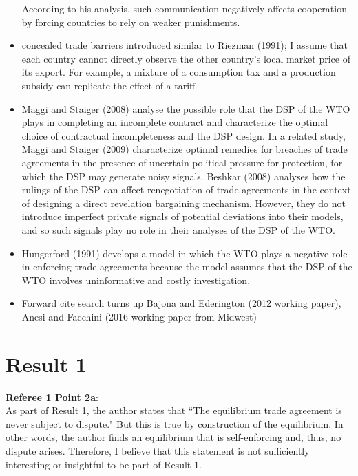 \documentclass[12pt]{article}
\begin{document}
\begin{itemize}
According to his analysis, such communication negatively affects cooperation by forcing countries to rely on weaker
punishments.
	\item concealed trade barriers introduced similar to Riezman (1991); I assume that each country cannot directly observe the other country’s local market price of its export. For example, a mixture of a consumption tax and a production subsidy can replicate the effect of a tariff
	\item Maggi and Staiger (2008) analyse the possible role that the DSP of the WTO plays in completing an incomplete
contract and characterize the optimal choice of contractual incompleteness and the DSP design. In a related study, Maggi
and Staiger (2009) characterize optimal remedies for breaches of trade agreements in the presence of uncertain political
pressure for protection, for which the DSP may generate noisy signals. Beshkar (2008) analyses how the rulings of the
DSP can affect renegotiation of trade agreements in the context of designing a direct revelation bargaining mechanism.
However, they do not introduce imperfect private signals of potential deviations into their models, and so such signals
play no role in their analyses of the DSP of the WTO.
	\item Hungerford (1991) develops a model in which the WTO plays a negative role in enforcing trade agreements
because the model assumes that the DSP of the WTO involves uninformative and costly investigation.
	\item Forward cite search turns up Bajona and Ederington (2012 working paper), Anesi and Facchini (2016 working paper from Midwest)
\end{itemize}

\newpage
\section{Result 1}
\textbf{Referee 1 Point 2a}: \\
As part of Result 1, the author states that ``The equilibrium trade agreement is never subject to dispute." But this is true by construction of the equilibrium. In other words, the author finds an equilibrium that is self-enforcing and, thus, no dispute arises. Therefore, I believe that this statement is not sufficiently interesting or insightful to be part of Result 1. \\

\newpage
\end{document}
